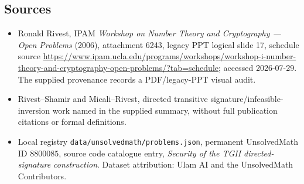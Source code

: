 \documentclass[11pt]{article}
\begin{document}
\subsection{Sources}
\begin{itemize}
\item Ronald Rivest, IPAM \emph{Workshop on Number Theory and Cryptography --- Open Problems} (2006), attachment 6243, legacy PPT logical slide 17, schedule source \url{https://www.ipam.ucla.edu/programs/workshops/workshop-i-number-theory-and-cryptography-open-problems/?tab=schedule}; accessed 2026-07-29. The supplied provenance records a PDF/legacy-PPT visual audit.
\item Rivest--Shamir and Micali--Rivest, directed transitive signature/infeasible-inversion work named in the supplied summary, without full publication citations or formal definitions.
\item Local registry \texttt{data/unsolvedmath/problems.json}, permanent UnsolvedMath ID $8800085$, source code catalogue entry, \emph{Security of the TGII directed-signature construction}. Dataset attribution: Ulam AI and the UnsolvedMath Contributors.
\end{itemize}
\end{document}
